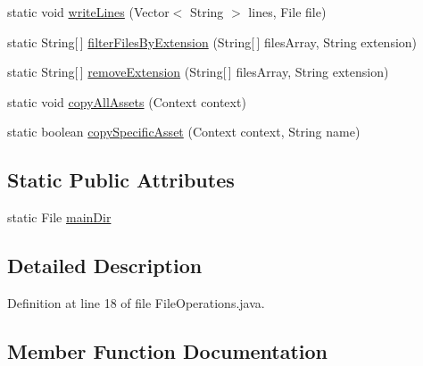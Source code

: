 \begin{DoxyCompactItemize}
\item 
static void \hyperlink{classpt_1_1lsts_1_1asa_1_1util_1_1FileOperations_a0aff19fcb86424e49a1520fa795cdf76}{write\+Lines} (Vector$<$ String $>$ lines, File file)
\item 
static String\mbox{[}$\,$\mbox{]} \hyperlink{classpt_1_1lsts_1_1asa_1_1util_1_1FileOperations_a5e1d4172b7efdf76c444175e7eff7600}{filter\+Files\+By\+Extension} (String\mbox{[}$\,$\mbox{]} files\+Array, String extension)
\item 
static String\mbox{[}$\,$\mbox{]} \hyperlink{classpt_1_1lsts_1_1asa_1_1util_1_1FileOperations_a53092cfc07efd7fdc44eb9441a32bcd9}{remove\+Extension} (String\mbox{[}$\,$\mbox{]} files\+Array, String extension)
\item 
static void \hyperlink{classpt_1_1lsts_1_1asa_1_1util_1_1FileOperations_a9a2c18916edbe9585d024d445d08877f}{copy\+All\+Assets} (Context context)
\item 
static boolean \hyperlink{classpt_1_1lsts_1_1asa_1_1util_1_1FileOperations_a2f7260ffc1f25dc8228c1cfbce4fae45}{copy\+Specific\+Asset} (Context context, String name)
\end{DoxyCompactItemize}
\subsection*{Static Public Attributes}
\begin{DoxyCompactItemize}
\item 
static File \hyperlink{classpt_1_1lsts_1_1asa_1_1util_1_1FileOperations_a87bb111eb431d2790126cbc9223f06a6}{main\+Dir}
\end{DoxyCompactItemize}


\subsection{Detailed Description}


Definition at line 18 of file File\+Operations.\+java.



\subsection{Member Function Documentation}
\hypertarget{classpt_1_1lsts_1_1asa_1_1util_1_1FileOperations_a9a2c18916edbe9585d024d445d08877f}{}
